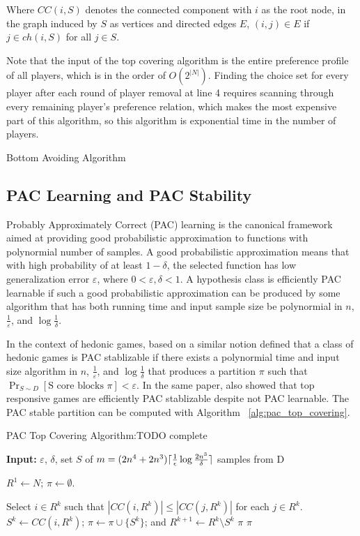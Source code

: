 \documentclass[letterpaper]{article} %
\DeclarePairedDelimiter{\ceil}{\lceil}{\rceil}
\begin{document}
Where $CC(i, S)$ denotes the connected component with $i$ as the root node, in the graph induced by $S$ as vertices and directed edges $E$, $(i, j) \in E$ if $j \in ch(i, S)$ for all $j \in S$.

Note that the input of the top covering algorithm is the entire preference profile of all players, which is in the order of $O(2^{|N|})$. Finding the choice set for every player after each round of player removal at line 4 requires scanning through every remaining player's preference relation, which makes the most expensive part of this algorithm, so this algorithm is exponential time in the number of players.

Bottom Avoiding Algorithm

\subsection{PAC Learning and PAC Stability}
Probably Approximately Correct (PAC) learning is the canonical framework aimed at providing good probabilistic approximation to functions with polynormial number of samples. A good probabilistic approximation means that with high probability of at least $1 - \delta$, the selected function has low generalization error $\varepsilon$, where $0 < \varepsilon, \delta < 1$. A hypothesis class is efficiently PAC learnable if such a good probabilistic approximation can be produced by some algorithm that has both running time and input sample size be polynormial in $n$, $\frac{1}{\varepsilon}$, and $\log{\frac{1}{\delta}}$.

In the context of hedonic games, based on a similar notion \cite{ijcai2017-380} defined that a class of hedonic games is PAC stablizable if there exists a polynormial time and input size algorithm in $n$, $\frac{1}{\varepsilon}$, and $\log{\frac{1}{\delta}}$ that produces a partition $\pi$ such that $\Pr_{S\sim D}[\text{S core blocks } \pi] < \varepsilon$. In the same paper, \cite{ijcai2017-380} also showed that top responsive games are efficiently PAC stablizable despite not PAC learnable. The PAC stable partition can be computed with Algorithm ~\ref{alg:pac_top_covering}.

\begin{algorithm}[htb]
  \caption{PAC Top Covering Algorithm:TODO complete}
  \label{alg:pac_top_covering}
  \textbf{Input:} $\varepsilon$, $\delta$, set $S$ of $m = (2n^4 + 2n^3)\ceil{\frac{1}{\epsilon}\log{\frac{2n^3}{\delta}}}$ samples from D

  \begin{algorithmic}[1]
\STATE $R^1 \leftarrow N$; $\pi \leftarrow \emptyset$.

\STATE Select $i\in R^k$ such that $|CC(i,R^k)| \leq |CC(j,R^k)|$ for each $j\in R^k$.
\STATE $S^k\leftarrow  CC(i,R^k)$; $\pi \leftarrow  \pi \cup \lbrace S^k \rbrace$;  and $R^{k+1} \leftarrow  R^k \setminus S^k$
\RETURN $\pi$
\ENDIF
\ENDFOR
\RETURN $\pi$
 \end{algorithmic}
\end{algorithm}
\end{document}
